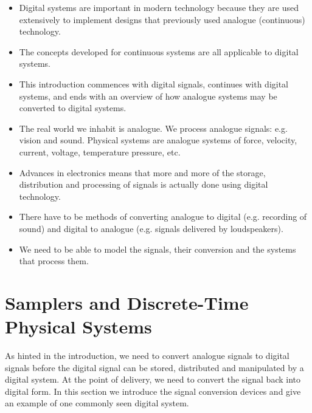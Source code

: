 \def\FileDate{98/11/04}
\def\FileVersion{1.0}

\begin{slide}\label{slide:l7s1}
\begin{itemize}
\item Digital systems are important in modern technology because they
  are used extensively to implement designs that previously used
  analogue (continuous) technology.
\item The concepts developed for continuous systems
  are all applicable to digital systems.
\item This introduction commences with digital signals, continues with
  digital systems, and ends with an overview of how analogue systems
  may be converted to digital systems.
\end{itemize}
\end{slide}

\begin{slide}\label{slide:l7s1a}
\begin{itemize}
\item The real world we inhabit is analogue. We process analogue
  signals: e.g. vision and sound. Physical systems are analogue
  systems of force, velocity, current, voltage, temperature pressure,
  etc.
\item Advances in electronics means that more and more of the storage,
  distribution and processing of signals is actually done using
  digital technology.
\item There have to be methods of converting analogue to digital (e.g.
  recording of sound) and digital to analogue (e.g. signals delivered
  by loudspeakers).
\item We need to be able to model the signals, their conversion and
  the systems that process them.
\end{itemize}
\end{slide}

\section*{Samplers and Discrete-Time Physical Systems}

As hinted in the introduction, we need to convert analogue signals to
digital signals before the digital signal can be stored, distributed and
manipulated by a digital system. At the point of delivery, we need to
convert the signal back into digital form. In this section we
introduce the signal conversion devices and give an example of one
commonly seen digital system.

